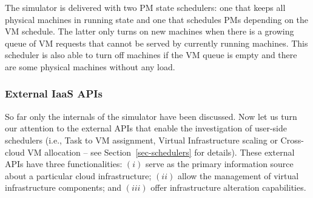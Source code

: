 \documentclass[sort, compress, 5p]{elsarticle}
\begin{document}
The simulator is delivered with two PM state schedulers: one that keeps all physical machines in running state and one that schedules PMs depending on the VM schedule. The latter only turns on new machines when there is a growing queue of VM requests that cannot be served by currently running machines. This scheduler is also able to turn off machines if the VM queue is empty and there are some physical machines without any load.

\subsubsection{External IaaS APIs} \label{SEC-UI}

So far only the internals of the simulator have been discussed. Now let us turn our attention to the external APIs that enable the investigation of user-side schedulers (i.e., Task to VM assignment, Virtual Infrastructure scaling or Cross-cloud VM allocation -- see Section~\ref{sec-schedulers} for details). These external APIs have three functionalities: $(i)$ serve as the primary information source about a particular cloud infrastructure; $(ii)$ allow the management of virtual infrastructure components; and $(iii)$ offer infrastructure alteration capabilities. 
\end{document}
